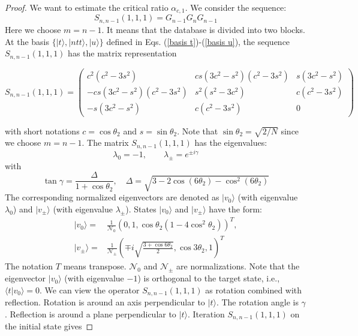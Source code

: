 \documentclass[%
 twocolumn,
 10pt,
 superscriptaddress,
 longbibliography,
 amsmath,amssymb,
 aps,
 pra,
floatfix,
]{revtex4-1}
\begin{document}
\begin{proof}
	We want to estimate the critical ratio $\alpha_{c,1}$. We consider the sequence:
	\begin{equation}
		S_{n,n-1}(1,1,1) = G_{n-1}G_{n}G_{n-1}
	\end{equation}
	Here we choose $m=n-1$. It means that the database is divided into two blocks. At the basis $\{|t\rangle,|ntt\rangle,|u\rangle\}$ defined in Eqs. (\ref{basis t})-(\ref{basis u}), the sequence $S_{n,n-1}(1,1,1)$ has the matrix representation
	\begin{widetext}
		\begin{equation}
			\label{def S 111}
			S_{n,n-1}(1,1,1)=\left(
			\begin{array}{ccc}
					c^2(c^2-3s^2)           & cs(3c^2-s^2)(c^2-3s^2) & s(3c^2-s^2) \\
					-cs(3c^2-s^2)(c^2-3s^2) & s^2(s^2-3c^2)          & c(c^2-3s^2) \\
					-s(3c^2-s^2)            & c(c^2-3s^2)            & 0
				\end{array}
			\right)
		\end{equation}
	\end{widetext}
	with short notations $c=\cos\theta_2$ and $s=\sin\theta_2$. Note that $\sin\theta_2=\sqrt{2/N}$ since we choose $m=n-1$. The matrix $S_{n,n-1}(1,1,1)$ has the eigenvalues:
	\begin{equation}
		\lambda_0 = -1,\quad\quad \lambda_\pm = e^{\pm i\gamma}
	\end{equation}
	with
	\begin{equation}
		\tan \gamma = \frac{\Delta}{1+\cos\theta_2},\quad
		\Delta = \sqrt {3-2\cos(6\theta_2)-\cos^2(6\theta_2)}
	\end{equation}
	The corresponding normalized eigenvectors are denoted as $|v_0\rangle$ (with eigenvalue $\lambda_0$) and $|v_\pm\rangle$ (with eigenvalue $\lambda_\pm$). States $|v_0\rangle$ and $|v_\pm\rangle$ have the form:
	\begin{subequations}
		\begin{align}
			\label{eigen lambda 0} |v_0\rangle =    & \frac 1 {\mathcal N_0}\left(0,1,\cos\theta_2(1-4\cos^2\theta_2)\right)^T,                       \\
			\label{eigen lambda +-} |v_\pm\rangle = & \frac 1 {\mathcal N_\pm}\left(\mp i \sqrt{\frac{3+\cos 6\theta_2}{2}},\cos 3\theta_2,1\right)^T
		\end{align}
	\end{subequations}
	The notation $T$ means transpose. $\mathcal N_0$ and $\mathcal N_\pm$ are normalizations. Note that the eigenvector $|v_0\rangle$ (with eigenvalue $-1$) is orthogonal to the target state, i.e., $\langle t|v_0\rangle=0$. We can view the operator $S_{n,n-1}(1,1,1)$ as rotation combined with reflection. Rotation is around an axis perpendicular to $|t\rangle$. The rotation angle is $\gamma$. Reflection is around a plane perpendicular to $|t\rangle$. Iteration $S_{n,n-1}(1,1,1)$ on the initial state gives

\end{proof}
\end{document}
